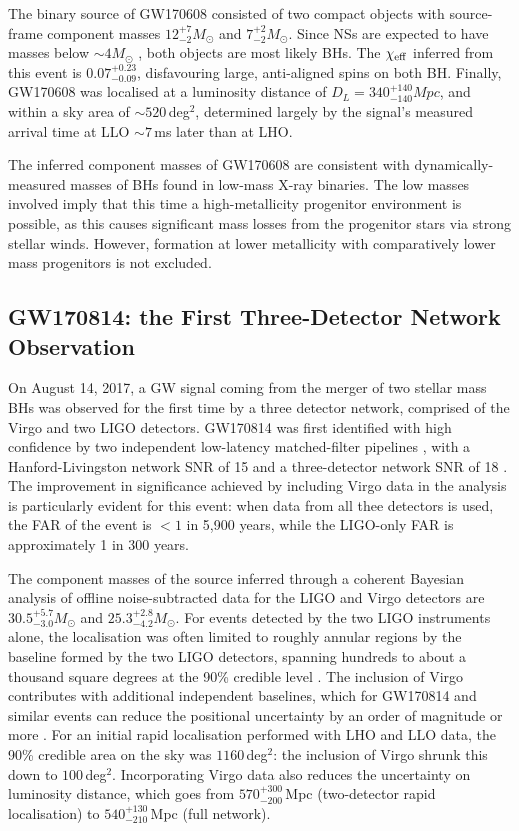 \documentclass[binding=0.6cm, LaM]{sapthesis}
\begin{document}
	The binary source of GW170608 consisted of two compact objects with source-frame component masses 
	$12^{+7}_{-2}M_\odot$ and $7^{+2}_{-2}M_\odot$.  
	Since NSs are expected to have masses below $\sim 4M_\odot$ \cite{141},
	both objects are most likely BHs. 
	The $\chi_{\rm eff}$ inferred from this event is $0.07^{+0.23}_{−0.09}$,
	disfavouring large, anti-aligned spins on both BH.
        Finally, GW170608 was localised at a luminosity distance of $D_L = 340^{+140}_{−140}Mpc$, 
	and within a sky area of $\sim 520\,$deg$^2$, determined largely by the signal's measured arrival time at LLO $\sim 7$\,ms later than at LHO.
 
	The inferred component masses of GW170608 are consistent with 
	dynamically-measured masses of BHs found in low-mass X-ray binaries.
	The low masses involved imply that this time a high-metallicity progenitor environment is possible, 
	as this causes significant mass losses from the progenitor stars via strong stellar winds.
	However, formation at lower metallicity with comparatively lower mass progenitors is not excluded.

\subsection{GW170814: the First Three-Detector Network Observation}	
	On August 14, 2017, a GW signal coming from the merger of two stellar mass BHs 
	was observed for the first time by a three detector network, comprised of the Virgo and two LIGO detectors. 
	GW170814 was first identified with high confidence by two independent 
	low-latency matched-filter pipelines \cite{111,112,114,146},
	with a Hanford-Livingston network SNR of 15 and a three-detector network SNR of 18 \cite{114,150,151}.
	The improvement in significance achieved by including Virgo data in the analysis is particularly evident 
	for this event: when data from all thee detectors is used, 
	the FAR of the event is $< 1$ in 5,900 years, while the LIGO-only FAR is approximately 1 in 300 years.

	The component masses of the source inferred through a coherent Bayesian analysis \cite{93, 152} 
	of offline noise-subtracted data for the LIGO and Virgo detectors 
        are $30.5^{+5.7}_{-3.0}M_\odot$ and $25.3^{+2.8}_{-4.2}M_\odot$.
	For events detected by the two LIGO instruments alone, the localisation 
	was often limited to roughly annular regions by the baseline formed by the two LIGO detectors,
	spanning hundreds to about a thousand square degrees at the 90\% credible level \cite{89,155,156}. 
	The inclusion of Virgo contributes with additional independent baselines, 
	which for GW170814 and similar events can reduce the positional uncertainty by an order of magnitude or more \cite{155}. 
	For an initial rapid localisation performed with LHO and LLO data, 
	the 90\% credible area on the sky was $1160\,$deg$^2$: the inclusion of Virgo shrunk this down to $100\,$deg$^2$.
	Incorporating Virgo data also reduces the uncertainty on luminosity distance, 
	which goes from $570^{+300}_{-200}\,$Mpc (two-detector rapid localisation) to $540^{+130}_{-210}\,$Mpc (full network).
\end{document}
